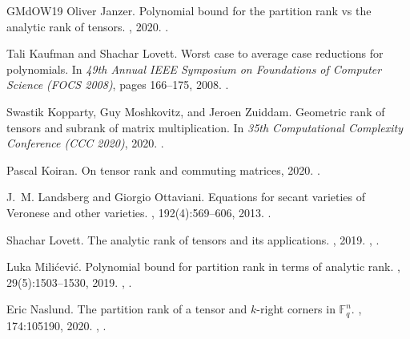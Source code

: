 \documentclass[10pt,a4paper]{article}
\theoremstyle{definition}
\theoremstyle{remark}
\begin{document}
\begin{thebibliography}{GMdOW19}
Oliver Janzer.
\newblock Polynomial bound for the partition rank vs the analytic rank of
  tensors.
, 2020.
\newblock \href {http://arxiv.org/abs/1902.11207} {}.

Tali Kaufman and Shachar Lovett.
\newblock Worst case to average case reductions for polynomials.
\newblock In {\em 49th Annual {IEEE} Symposium on Foundations of Computer
  Science ({FOCS} 2008)}, pages 166--175, 2008.
\newblock \href {https://doi.org/10.1109/FOCS.2008.17}
  {}.

Swastik Kopparty, Guy Moshkovitz, and Jeroen Zuiddam.
\newblock Geometric rank of tensors and subrank of matrix multiplication.
\newblock In {\em 35th Computational Complexity Conference ({CCC} 2020)}, 2020.
\newblock \href {https://doi.org/10.4230/LIPIcs.CCC.2020.35}
  {}.

Pascal Koiran.
\newblock On tensor rank and commuting matrices, 2020.
\newblock \href {http://arxiv.org/abs/2006.02374} {}.

J.~M. Landsberg and Giorgio Ottaviani.
\newblock Equations for secant varieties of {V}eronese and other varieties.
, 192(4):569--606, 2013.
\newblock \href {https://doi.org/10.1007/s10231-011-0238-6}
  {}.

Shachar Lovett.
\newblock The analytic rank of tensors and its applications.
, 2019.
\newblock \href {http://arxiv.org/abs/1806.09179} {},
  \href {https://doi.org/10.19086/da.8654} {}.

Luka Mili{\'c}evi{\'c}.
\newblock Polynomial bound for partition rank in terms of analytic rank.
, 29(5):1503--1530, 2019.
\newblock \href {http://arxiv.org/abs/1902.09830} {},
  \href {https://doi.org/10.1007/s00039-019-00505-4}
  {}.

Eric Naslund.
\newblock The partition rank of a tensor and $k$-right corners in
  $\mathbb{F}_q^n$.
, 174:105190, 2020.
\newblock \href {http://arxiv.org/abs/1701.04475} {},
  \href {https://doi.org/10.1016/j.jcta.2019.105190}
  {}.


\end{thebibliography}
\end{document}
